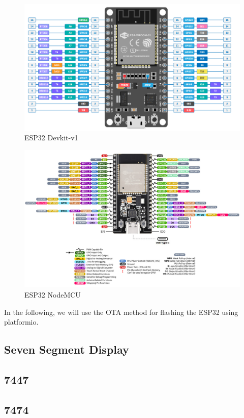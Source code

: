 \begin{figure}[h]
    \centering
    \includegraphics[width=1\linewidth]{esp32/figs/esp32.png}
    \caption{ESP32 Devkit-v1}
    \label{fig:esp32}
\end{figure}
\begin{figure}[h]
    \centering
    \includegraphics[width=1\linewidth]{esp32/figs/nodeMCU.png}
    \caption{ESP32 NodeMCU}
    \label{fig:nodemcu}
\end{figure}
In the following, we will use the OTA method for flashing the ESP32 using platformio.

\subsection{Seven Segment Display}


\subsection{7447}


\subsection{7474}

%

